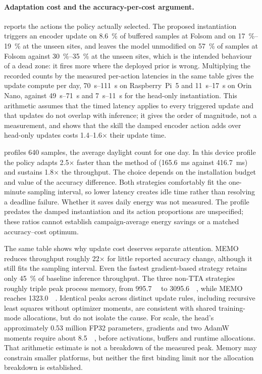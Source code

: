 \paragraph{Adaptation cost and the accuracy-per-cost argument.}  reports the actions the policy actually selected. The proposed instantiation triggers an encoder update on \SI{8.6}{\percent} of buffered samples at Folsom and on \SIrange{17}{19}{\percent} at the unseen sites, and leaves the model unmodified on \SI{57}{\percent} of samples at Folsom against \SIrange{30}{35}{\percent} at the unseen sites, which is the intended behaviour of a dead zone: it fires more where the deployed prior is wrong. Multiplying the recorded counts by the measured per-action latencies in the same table gives the update compute per day, \SIrange{70}{111}{\second} on Raspberry~Pi~5 and \SIrange{11}{17}{\second} on Orin Nano, against \SIrange{49}{71}{\second} and \SIrange{7}{11}{\second} for the head-only instantiation. This arithmetic assumes that the timed latency applies to every triggered update and that updates do not overlap with inference; it gives the order of magnitude, not a measurement, and shows that the skill the damped encoder action adds over head-only updates costs \numrange{1.4}{1.6}$\times$ their update time.

 profiles 640 samples, the average daylight count for one day. In this device profile the policy adapts \num{2.5}$\times$ faster than the method of \citet{LARABENITEZ2023126312} (\SI{165.6}{\milli\second} against \SI{416.7}{\milli\second}) and sustains \num{1.8}$\times$ the throughput. The choice depends on the installation budget and value of the accuracy difference. Both strategies comfortably fit the one-minute sampling interval, so lower latency creates idle time rather than resolving a deadline failure. Whether it saves daily energy was not measured. The profile predates the damped instantiation and its action proportions are unspecified; these ratios cannot establish campaign-average energy savings or a matched accuracy--cost optimum.

The same table shows why update cost deserves separate attention. MEMO reduces throughput roughly \num{22}$\times$ for little reported accuracy change, although it still fits the sampling interval. Even the fastest gradient-based strategy retains only \SI{45}{\percent} of baseline inference throughput. The three non-TTA strategies roughly triple peak process memory, from \SI{995.7}{\mega\byte} to \SI{3095.6}{\mega\byte}, while MEMO reaches \SI{1323.0}{\mega\byte}. Identical peaks across distinct update rules, including recursive least squares without optimizer moments, are consistent with shared training-mode allocations, but do not isolate the cause. For scale, the head's approximately \num{0.53} million FP32 parameters, gradients and two AdamW moments require about \SI{8.5}{\mega\byte}, before activations, buffers and runtime allocations. That arithmetic estimate is not a breakdown of the measured peak. Memory may constrain smaller platforms, but neither the first binding limit nor the allocation breakdown is established.

